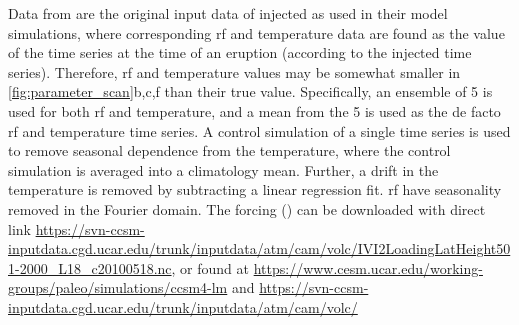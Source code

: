 \documentclass{ametsocV6.1}
\newcommand{\iso}[1][i]{{#1}njected \ce{SO2}}
\begin{document}
%






%



\appendix

\label{app:ob16}

Data from \citet{ottobliesner2016} are the original input data of \iso{} as used in
their model simulations, where corresponding \gls{rf} and temperature data are found as
the value of the time series at the time of an eruption (according to the \iso{} time
series). Therefore, \gls{rf} and temperature values may be somewhat smaller in
\ref{fig:parameter_scan}b,c,f than their true value. Specifically, an ensemble of 5 is
used for both \gls{rf} and temperature, and a mean from the 5 is used as the de facto
\gls{rf} and temperature time series. A control simulation of a single time series is
used to remove seasonal dependence from the temperature, where the control simulation is
averaged into a climatology mean. Further, a drift in the temperature is removed by
subtracting a linear regression fit. \gls{rf} have seasonality removed in the Fourier
domain. The forcing () can be downloaded with direct link
\url{https://svn-ccsm-inputdata.cgd.ucar.edu/trunk/inputdata/atm/cam/volc/IVI2LoadingLatHeight501-2000_L18_c20100518.nc},
or found at \url{https://www.cesm.ucar.edu/working-groups/paleo/simulations/ccsm4-lm}
and \url{https://svn-ccsm-inputdata.cgd.ucar.edu/trunk/inputdata/atm/cam/volc/}
\end{document}
